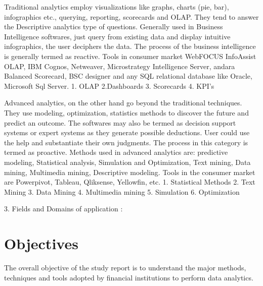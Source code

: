 Traditional analytics employ visualizations like graphs, charts (pie, bar), infographics etc., querying, reporting, scorecards and OLAP. They tend to answer the Descriptive analytics type of questions. Generally used in Business Intelligence softwares, just query from existing data and display intuitive infographics, the user deciphers the data. The process of the business intelligence is generally termed as reactive.
Tools in consumer market WebFOCUS InfoAssist OLAP, IBM Cognos, Netweaver, Microstrategy Intelligence Server, andara Balanced Scorecard, BSC designer and any SQL relational database like Oracle, Microsoft Sql Server.
1. OLAP
2.Dashboards
3. Scorecards
4. KPI’s

Advanced analytics, on the other hand go beyond the traditional techniques. They use modeling, optimization, statistics methods to discover the future and predict an outcome. The softwares may also be termed as decision support systems or expert systems as they generate possible deductions. User could use the help and substantiate their own judgments. The process in this category is termed as proactive.
Methods used in advanced analytics are: predictive modeling, Statistical analysis, Simulation and Optimization, Text mining, Data mining, Multimedia mining, Descriptive modeling.
Tools in the consumer market are Powerpivot, Tableau, Qliksense, Yellowfin, etc.
1. Statistical Methods
2. Text Mining
3. Data Mining
4. Multimedia mining
5. Simulation
6. Optimization


3. Fields and Domains of application :



\section{Objectives}

The overall objective of the study report is to understand the major methods, techniques and tools adopted by financial institutions to perform data analytics.






\FloatBarrier
